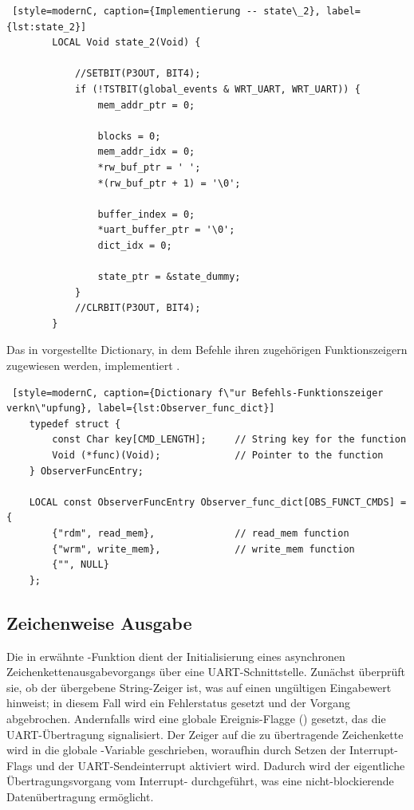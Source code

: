 \begin{itemize}
	\vspace{0.5cm}
	\begin{lstlisting} [style=modernC, caption={Implementierung -- state\_2}, label={lst:state_2}]
		LOCAL Void state_2(Void) {
			
			//SETBIT(P3OUT, BIT4);
			if (!TSTBIT(global_events & WRT_UART, WRT_UART)) {
				mem_addr_ptr = 0;
				
				blocks = 0;
				mem_addr_idx = 0;
				*rw_buf_ptr = ' ';
				*(rw_buf_ptr + 1) = '\0';
				
				buffer_index = 0;
				*uart_buffer_ptr = '\0';
				dict_idx = 0;
				
				state_ptr = &state_dummy;
			}
			//CLRBIT(P3OUT, BIT4);
		}
	\end{lstlisting}
	
\end{itemize}
 
Das in  vorgestellte Dictionary, in dem Befehle ihren zugeh\"origen Funktionszeigern zugewiesen werden, implementiert .

	\vspace{0.5cm}
\begin{lstlisting} [style=modernC, caption={Dictionary f\"ur Befehls-Funktionszeiger verkn\"upfung}, label={lst:Observer_func_dict}]
	typedef struct {
		const Char key[CMD_LENGTH];     // String key for the function
		Void (*func)(Void);             // Pointer to the function
	} ObserverFuncEntry;
	
	LOCAL const ObserverFuncEntry Observer_func_dict[OBS_FUNCT_CMDS] = {
		{"rdm", read_mem},              // read_mem function
		{"wrm", write_mem},             // write_mem function
		{"", NULL}
	};
\end{lstlisting}
 
 
 
\newpage
\subsection{Zeichenweise Ausgabe}
\label{sec:observer_print}

Die in  erw\"ahnte -Funktion dient der Initialisierung eines asynchronen Zeichenkettenausgabevorgangs \"uber eine UART-Schnittstelle. Zun\"achst \"uberpr\"uft sie, ob der \"ubergebene String-Zeiger  ist, was auf einen ung\"ultigen Eingabewert hinweist; in diesem Fall wird ein Fehlerstatus gesetzt und der Vorgang abgebrochen. Andernfalls wird eine globale Ereignis-Flagge () gesetzt, das die UART-\"Ubertragung signalisiert. Der Zeiger auf die zu \"ubertragende Zeichenkette wird in die globale -Variable geschrieben, woraufhin durch Setzen der Interrupt-Flags  und  der UART-Sendeinterrupt aktiviert wird. Dadurch wird der eigentliche \"Ubertragungsvorgang vom Interrupt- durchgef\"uhrt, was eine nicht-blockierende Daten\"ubertragung erm\"oglicht.

